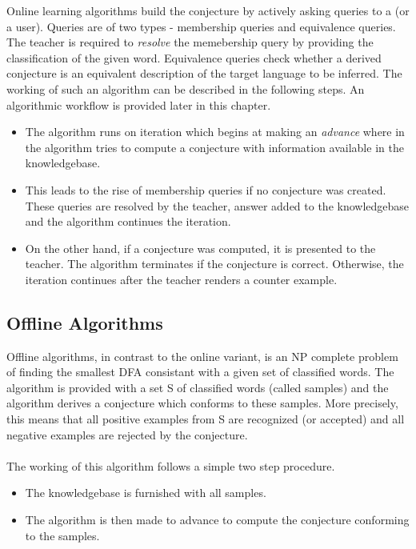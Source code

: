 Online learning algorithms build the conjecture by actively asking queries to a \teacher (or a user). Queries are of two types - membership queries and equivalence queries. The teacher is required to \emph{resolve} the memebership query by providing the classification of the given word.
Equivalence queries check whether a derived conjecture is an equivalent description of the target language to be inferred.
The working of such an algorithm can be described in the following steps. An algorithmic workflow is provided later in this chapter.
\begin{itemize}
 \item The algorithm runs on iteration which begins at making an \emph{advance} where in the algorithm tries to compute a conjecture with information available in the knowledgebase.
 \item This leads to the rise of membership queries if no conjecture was created. These queries are resolved by the teacher, answer added to the knowledgebase and the algorithm continues the iteration.
 \item On the other hand, if a conjecture was computed, it is presented to the teacher. The algorithm terminates if the conjecture is correct. Otherwise, the iteration continues after the teacher renders a counter example.
\end{itemize}

\subsection{Offline Algorithms}

Offline algorithms, in contrast to the online variant, is an NP complete problem of finding the smallest DFA consistant with a given set of classified words.
The algorithm is provided with a set S of classified words (called samples) and the algorithm derives a conjecture which conforms to these samples. More precisely, this means that all positive examples from S are recognized (or accepted) and all negative examples are rejected by the conjecture. 
\paragraph{}
The working of this algorithm follows a simple two step procedure. 
\begin{itemize}
 \item The knowledgebase is furnished with all samples. 
 \item The algorithm is then made to advance to compute the conjecture conforming to the samples. 
\end{itemize}

